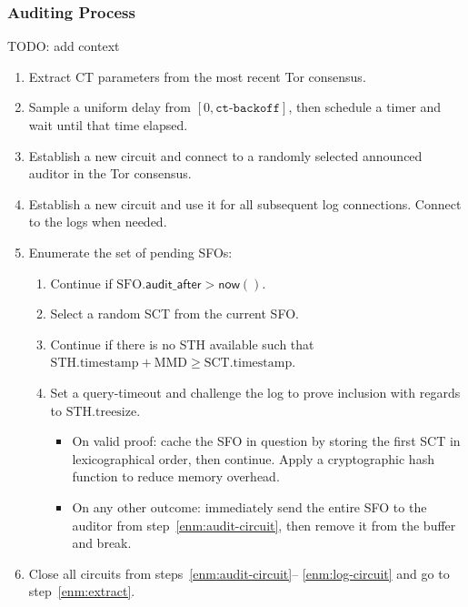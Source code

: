 \subsubsection{Auditing Process}
TODO: add context
\begin{enumerate}
	\item\label{enm:extract} Extract CT parameters from the most recent Tor
		consensus.
	\item\label{enm:backoff} Sample a uniform delay from
			$[0, \texttt{ct-backoff}]$,
		then schedule a timer and wait until that time elapsed.
	\item\label{enm:audit-circuit} Establish a new circuit and connect to a
		randomly selected announced auditor in the Tor consensus.
	\item\label{enm:log-circuit} Establish a new circuit and use it for all
		subsequent log connections.  Connect to the logs when needed.
	\item\label{enm:audit-loop} Enumerate the set of pending SFOs:
		\begin{enumerate}
			\item Continue if
				$\textrm{SFO}.\mathsf{audit\_after} > \mathsf{now}()$.
			\item Select a random SCT from the current SFO.
			\item Continue if there is no STH available such that
					$\textrm{STH.timestamp} + \textrm{MMD} \ge
					\textrm{SCT.timestamp}$.
			\item Set a query-timeout and challenge the log to prove
				inclusion with regards to $\textrm{STH.treesize}$.
				\begin{itemize}
					\item On valid proof: cache the SFO in question by storing
						the first SCT in lexicographical order, then continue.
						Apply a cryptographic hash function to reduce memory
						overhead.
					\item On any other outcome: immediately send the entire SFO
						to the auditor from step~\ref{enm:audit-circuit}, then
						remove it from the buffer and break.
				\end{itemize}
		\end{enumerate}
	\item Close all circuits from steps~\ref{enm:audit-circuit}--%
		\ref{enm:log-circuit} and go to step~\ref{enm:extract}.
\end{enumerate}

